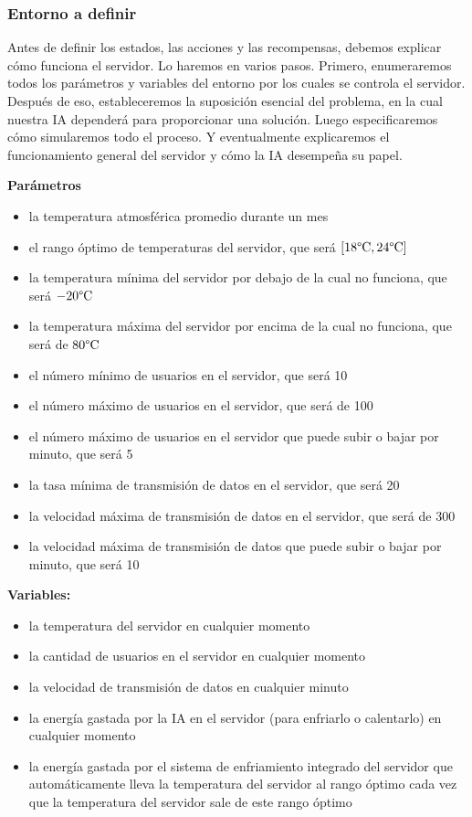 \documentclass[]{book}
\providecommand{\tightlist}{%
  \setlength{\itemsep}{0pt}\setlength{\parskip}{0pt}}
\begin{document}
\hypertarget{entorno-a-definir-1}{%
\subsubsection{Entorno a definir}\label{entorno-a-definir-1}}

Antes de definir los estados, las acciones y las recompensas, debemos explicar cómo funciona el servidor. Lo haremos en varios pasos. Primero, enumeraremos todos los parámetros y variables del entorno por los cuales se controla el servidor. Después de eso, estableceremos la suposición esencial del problema, en la cual nuestra IA dependerá para proporcionar una solución. Luego especificaremos cómo simularemos todo el proceso. Y eventualmente explicaremos el funcionamiento general del servidor y cómo la IA desempeña su papel.

\textbf{Parámetros}

\begin{itemize}
\tightlist
\item
  la temperatura atmosférica promedio durante un mes
\item
  el rango óptimo de temperaturas del servidor, que será \([18 \degree \textrm{C}, 24 \degree \textrm{C}]\)
\item
  la temperatura mínima del servidor por debajo de la cual no funciona, que será \(-20 \degree \textrm {C}\)
\item
  la temperatura máxima del servidor por encima de la cual no funciona, que será de \(80 \degree \textrm {C}\)
\item
  el número mínimo de usuarios en el servidor, que será 10
\item
  el número máximo de usuarios en el servidor, que será de 100
\item
  el número máximo de usuarios en el servidor que puede subir o bajar por minuto, que será 5
\item
  la tasa mínima de transmisión de datos en el servidor, que será 20
\item
  la velocidad máxima de transmisión de datos en el servidor, que será de 300
\item
  la velocidad máxima de transmisión de datos que puede subir o bajar por minuto, que será 10
\end{itemize}

\textbf{Variables:}

\begin{itemize}
\tightlist
\item
  la temperatura del servidor en cualquier momento
\item
  la cantidad de usuarios en el servidor en cualquier momento
\item
  la velocidad de transmisión de datos en cualquier minuto
\item
  la energía gastada por la IA en el servidor (para enfriarlo o calentarlo) en cualquier momento
\item
  la energía gastada por el sistema de enfriamiento integrado del servidor que automáticamente lleva la temperatura del servidor al rango óptimo cada vez que la temperatura del servidor sale de este rango óptimo
\end{itemize}
\end{document}
